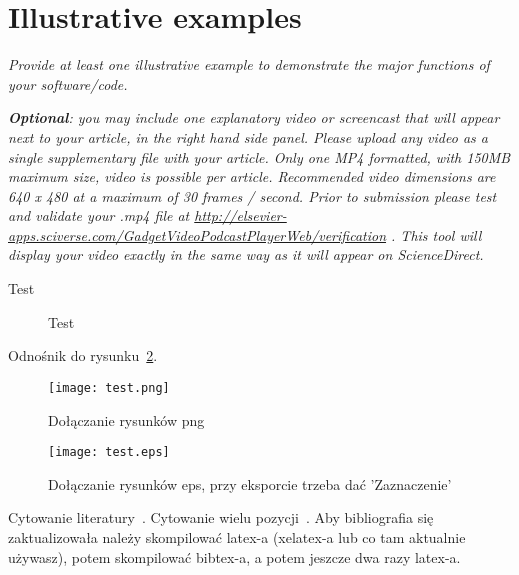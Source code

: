
\section{Illustrative examples}

\textit{Provide at least one illustrative example to demonstrate the major
functions of your software/code.}

\textit{\textbf{Optional}: you may include one explanatory  video or screencast that will appear next to your article, in the right hand side panel. Please upload any video as a single supplementary file with your article. Only one MP4 formatted, with 150MB maximum size, video is possible per article. Recommended video dimensions are 640 x 480 at a maximum of 30 frames / second. Prior to submission please test and validate your .mp4 file at  \url{http://elsevier-apps.sciverse.com/GadgetVideoPodcastPlayerWeb/verification} . This tool will display your video exactly in the same way as it will appear on ScienceDirect. }

\begin{table}[!h]

\caption{Test}
\label{testTable}
\end{table}

\begin{figure}[!h]

\caption{Test}
\label{testFig}
\end{figure}

Odnośnik do rysunku~\ref{testPng}.

\begin{figure}[!h]
\texttt{[image: test.png]}
\caption{Dołączanie rysunków png}
\label{testPng}
\end{figure}

\begin{figure}[!h]
\texttt{[image: test.eps]}
\caption{Dołączanie rysunków eps, przy eksporcie trzeba dać 'Zaznaczenie'}
\label{testEPS}
\end{figure}

Cytowanie literatury~\cite{council_of_the_eu_annex_2022}. Cytowanie wielu pozycji~\cite{polish_alternative_fuels_association_polish_nodate,buchanan_objectivity_1998}. Aby bibliografia się zaktualizowała należy skompilować latex-a (xelatex-a lub co tam aktualnie używasz), potem skompilować bibtex-a, a potem jeszcze dwa razy latex-a.

